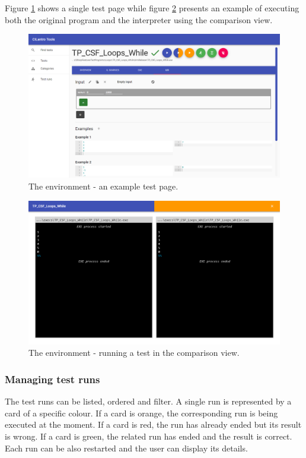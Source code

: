 \documentclass{article}
\numberwithin{equation}{section}
\begin{document}
Figure \ref{fig:tools_test} shows a single test page while figure \ref{fig:tools_run_both} presents an example of executing both the original program and the interpreter using the comparison view.

\begin{figure}
	\includegraphics[width=1\textwidth]{tools_test.png}
    \centering
    \caption{The environment - an example test page.}
    \label{fig:tools_test}
\end{figure}

\begin{figure}
	\includegraphics[width=1\textwidth]{tools_run_both.png}
    \centering
    \caption{The environment - running a test in the comparison view.}
    \label{fig:tools_run_both}
\end{figure}

\subsubsection{Managing test runs}

The test runs can be listed, ordered and filter. A single run is represented by a card of a specific colour. If a card is orange, the corresponding run is being executed at the moment. If a card is red, the run has already ended but its result is wrong. If a card is green, the related run has ended and the result is correct. Each run can be also restarted and the user can display its details.
\end{document}
